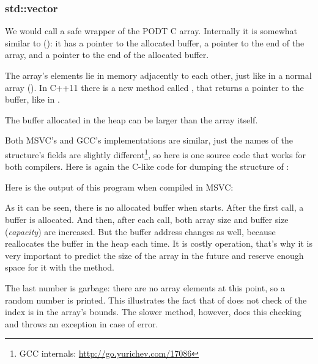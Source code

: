\subsubsection{std::vector}

We would call  a safe wrapper of the \ac{PODT} C array.
Internally it is somewhat similar to  ():
it has a pointer to the allocated buffer, a pointer to the end of the array, and a pointer to the end of the allocated buffer.

The array's elements  lie in memory adjacently to each other, just like in a normal array ().
In C++11 there is a new method called  , that returns a pointer to the buffer, like  in .

The buffer allocated in the \gls{heap} can be larger than the array itself.

Both MSVC's and GCC's implementations are similar, just the names of the structure's fields are slightly different\footnote
{GCC internals: \url{http://go.yurichev.com/17086}}, so here is one source
code that works for both compilers.
Here is again the C-like code for dumping the structure of :



Here is the output of this program when compiled in MSVC:



As it can be seen, there is no allocated buffer when \main starts.
After the first  call, a buffer is allocated.
And then, after each  
call, both array size and buffer size (\emph{capacity}) are increased.
But the buffer address changes as well, because  
reallocates the buffer in the \gls{heap} each time.
It is costly operation, that's why it is very important to predict the size of the array in the future and reserve 
enough space for it with the  method.

The last number is garbage: there are no array elements at this point, so a random number is printed.
This illustrates the fact that  of 
 does not check of the index is in the array's bounds.
The slower  
method, however, does this checking and throws an  
exception in case of error.


